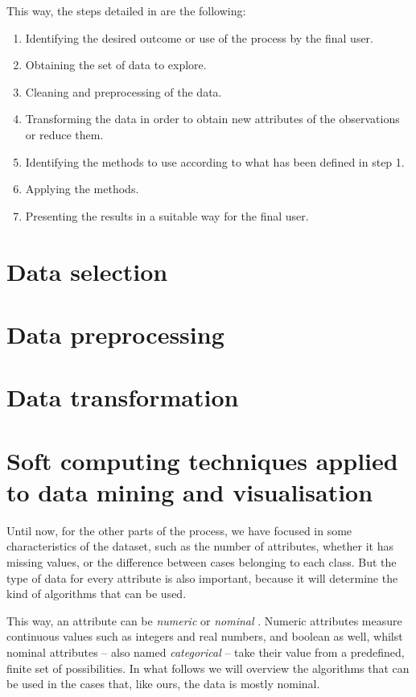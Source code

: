 This way, the steps detailed in \cite{fayyad1996data} are the following:

\begin{enumerate}
	\item Identifying the desired outcome or use of the process by the final user.
	\item Obtaining the set of data to explore.
	\item Cleaning and preprocessing of the data.
	\item Transforming the data in order to obtain new attributes of the observations or reduce them.
	\item Identifying the methods to use according to what has been defined in step 1.
	\item Applying the methods.
	\item Presenting the results in a suitable way for the final user.
\end{enumerate}

\section{Data selection}

\section{Data preprocessing}

\section{Data transformation}

\section{Soft computing techniques applied to data mining and visualisation}

Until now, for the other parts of the process, we have focused in some characteristics of the dataset, such as the number of attributes, whether it has missing values, or the difference between cases belonging to each class. But the type of data for every attribute is also important, because it will determine the kind of algorithms that can be used.

This way, an attribute can be \textit{numeric} or \textit{nominal} \cite{witten2016data}. Numeric attributes measure continuous values such as integers and real numbers, and boolean as well, whilst nominal attributes -- also named \textit{categorical} -- take their value from a predefined, finite set of possibilities. In what follows we will overview the algorithms that can be used in the cases that, like ours, the data is mostly nominal.


